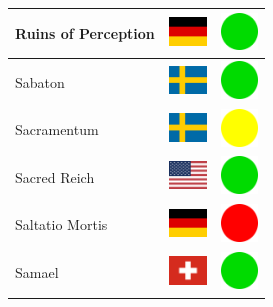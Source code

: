 \documentclass[12pt, a4paper, twoside]{report}
\begin{document}
\begin{center}
\begin{longtable}{|p{5cm}|p{2cm}|p{2cm}|}
Ruins of Perception & \includegraphics[width=1cm]{4x3/de} & \includegraphics[width=1cm]{likes/y} \\ \hline
Sabaton & \includegraphics[width=1cm]{4x3/se} & \includegraphics[width=1cm]{likes/y} \\ \hline
Sacramentum﻿ & \includegraphics[width=1cm]{4x3/se} & \includegraphics[width=1cm]{likes/m} \\ \hline
Sacred Reich & \includegraphics[width=1cm]{4x3/us} & \includegraphics[width=1cm]{likes/y} \\ \hline
Saltatio Mortis & \includegraphics[width=1cm]{4x3/de} & \includegraphics[width=1cm]{likes/n} \\ \hline
Samael & \includegraphics[width=1cm]{4x3/ch} & \includegraphics[width=1cm]{likes/y} \\ \hline

\end{longtable}
\end{center}
\end{document}
